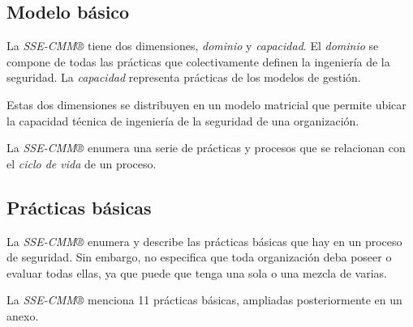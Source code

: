 \documentclass[11pt,a4paper]{article}
\begin{document}
\subsection{Modelo básico}
\label{sec:basico}

La \emph{SSE-CMM®} tiene dos dimensiones, \emph{dominio} y
\emph{capacidad}. El \emph{dominio} se compone de todas las prácticas
que colectivamente definen la ingeniería de la seguridad. La
\emph{capacidad} representa prácticas de los modelos de gestión.

Estas dos dimensiones se distribuyen en un modelo matricial que
permite ubicar la capacidad técnica de ingeniería de la seguridad de
una organización.

La \emph{SSE-CMM®} enumera una serie de prácticas y procesos que se
relacionan con el \emph{ciclo de vida} de un proceso.

\subsection{Prácticas básicas}
\label{sec:practicas}

La \emph{SSE-CMM®} enumera y describe las prácticas básicas que hay en
un proceso de seguridad. Sin embargo, no especifica que toda
organización deba poseer o evaluar todas ellas, ya que puede que tenga
una sola o una mezcla de varias.

La \emph{SSE-CMM®} menciona 11 prácticas básicas, ampliadas
posteriormente en un anexo.
\end{document}
